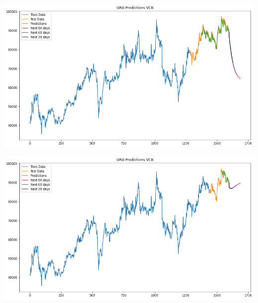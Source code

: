 \documentclass[conference]{IEEEtran}
\begin{document}
\begin{minipage}{0.23\textwidth}
    \centering
    \includegraphics[width=\linewidth]{images/GRU/GRU_VCB_82.png}
    \label{fig:image1}
\end{minipage}
\hfill
\begin{minipage}{0.23\textwidth}
    \centering
    \includegraphics[width=\linewidth]{images/GRU/GRU_VCB_91.png}
    \label{fig:image2}
\end{minipage}
\end{document}
